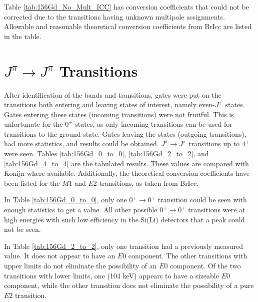 \afterpage{\clearpage}

Table \ref{tab:156Gd_No_Mult_ICC} has conversion coefficients that could not be corrected due to the transitions having unknown multipole assignments. Allowable and reasonable theoretical conversion coefficients from BrIcc\citep{kibedi08:_BRICC} are listed in the table.

\afterpage{\clearpage}

\section{$J^{\pi}\rightarrow J^{\pi}$ Transitions}

After identification of the bands and transitions, gates were put on the transitions both entering and leaving states of interest, namely even-$J^+$ states. Gates entering these states (incoming transitions) were not fruitful. This is unfortunate for the $0^+$ states, as only incoming transitions can be used for transitions to the ground state. Gates leaving the states (outgoing transitions), had more statistics, and results could be obtained. $J^\pi\rightarrow J^\pi$ transitions up to $4^+$ were seen. Tables \ref{tab:156Gd_0_to_0}, \ref{tab:156Gd_2_to_2}, and \ref{tab:156Gd_4_to_4} are the tabulated results. These values are compared with Konijn\citep{konijn81:_156gd} where available. Additionally, the theoretical conversion coefficients have been listed for the $M1$ and $E2$ transitions, as taken from BrIcc\citep{kibedi08:_BRICC}.

In Table \ref{tab:156Gd_0_to_0}, only one $0^+\rightarrow0^+$ transition could be seen with enough statistics to get a value. All other possible $0^+\rightarrow0^+$ transitions were at high energies with such low efficiency in the Si(Li) detectors that a peak could not be seen.
    
\afterpage{\clearpage}

In Table \ref{tab:156Gd_2_to_2}, only one transition had a previously measured value. It does not appear to have an $E0$ component. The other transitions with upper limits do not eliminate the possibility of an $E0$ component. Of the two transitions with lower limits, one (104 keV) appears to have a sizeable $E0$ component, while the other transition does not eliminate the possibility of a pure $E2$ transition.

\afterpage{\clearpage}

